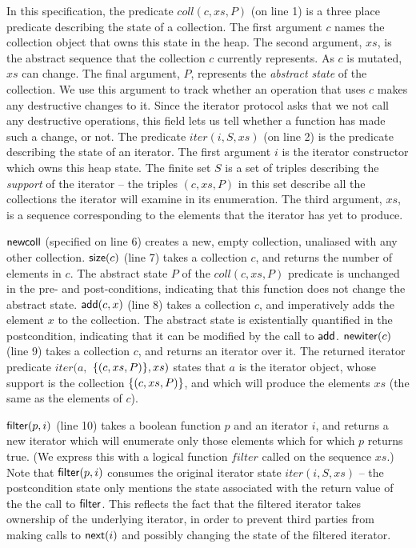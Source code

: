 \documentclass[preprint,natbib]{sigplanconf}
\begin{document}
In this specification, the predicate $coll(c, xs, P)$ (on line 1) is a
three place predicate describing the state of a collection. The first
argument $c$ names the collection object that owns this state in the
heap. The second argument, $xs$, is the abstract sequence that the
collection $c$ currently represents. As $c$ is mutated, $xs$ can
change. The final argument, $P$, represents the \emph{abstract state}
of the collection. We use this argument to track whether an operation
that uses $c$ makes any destructive changes to it. Since the iterator
protocol asks that we not call any destructive operations, this field
lets us tell whether a function has made such a change, or not.
%
The predicate $iter(i, S, xs)$ (on line 2) is the predicate describing
the state of an iterator. The first argument $i$ is the iterator
constructor which owns this heap state. The finite set $S$ is a set of
triples describing the \emph{support} of the iterator -- the triples
$(c,xs,P)$ in this set describe all the collections the iterator will
examine in its enumeration. The third argument, $xs$, is a sequence 
corresponding to the elements that the iterator has yet to produce. 

$\mbox{\textsf{{newcoll}}}$ (specified on line 6) creates a new,
empty collection, unaliased with any other collection. 
$\mbox{\textsf{{size}}}(c)$ (line 7) takes a
collection $c$, and returns the number of elements in $c$. The
abstract state $P$ of the $coll(c, xs, P)$ predicate is unchanged in
the pre- and post-conditions, indicating that this function does not
change the abstract state. $\mbox{\textsf{{add}}}(c, x)$ 
(line 8) takes a collection $c$, and imperatively
adds the element $x$ to the collection. The abstract state is
existentially quantified in the postcondition, indicating that it can
be modified by the call to $\mbox{\textsf{{add}}}$.
%
$\mbox{\textsf{{newiter}}}(c)$ (line 9) takes a collection $c$, and returns an
iterator over it. The returned iterator predicate $iter(a,$
$\{{(c, xs, P)}\}, xs)$ states that $a$ is the iterator object,
whose support is the collection $\{{(c, xs, P)}\}$, and which will
produce the elements $xs$ (the same as the elements of $c$).

$\mbox{\textsf{{filter}}}(p, i)$ (line 10) takes a boolean function $p$ and an
iterator $i$, and returns a new iterator which will enumerate only
those elements which for which $p$ returns true. (We express this with
a logical function $filter$ called on the sequence $xs$.) Note that
$\mbox{\textsf{{filter}}}(p, i)$ consumes the original iterator state
$iter(i, S, xs)$ -- the postcondition state only mentions the state
associated with the return value of the the call to
$\mbox{\textsf{{filter}}}$. This reflects the fact that the filtered iterator
takes ownership of the underlying iterator, in order to prevent third
parties from making calls to $\mbox{\textsf{{next}}}(i)$ and possibly changing
the state of the filtered iterator.
\end{document}
